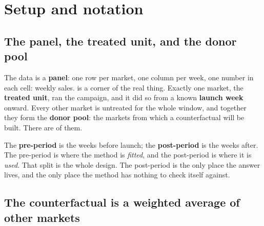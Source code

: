 \section{Setup and notation}
\label{sec:sc:vocab}

\subsection*{The panel, the treated unit, and the donor pool}

The data is a \textbf{panel}: one row per market, one column per week, one number in each cell:
weekly sales.  is a corner of the real thing. Exactly one market, the
\textbf{treated unit}, ran the campaign, and it did so from a known \textbf{launch week} onward.
Every other market is untreated for the whole window, and together they form the
\textbf{donor pool}: the markets from which a counterfactual will be built. There are
\nbSevenNDonors{} of them.



The \textbf{pre-period} is the weeks before launch; the \textbf{post-period} is the weeks after.
The pre-period is where the method is \emph{fitted}, and the post-period is where it is
\emph{used}. That split is the whole design. The post-period is the only place the answer lives,
and the only place the method has nothing to check itself against.

\subsection*{The counterfactual is a weighted average of other markets}

